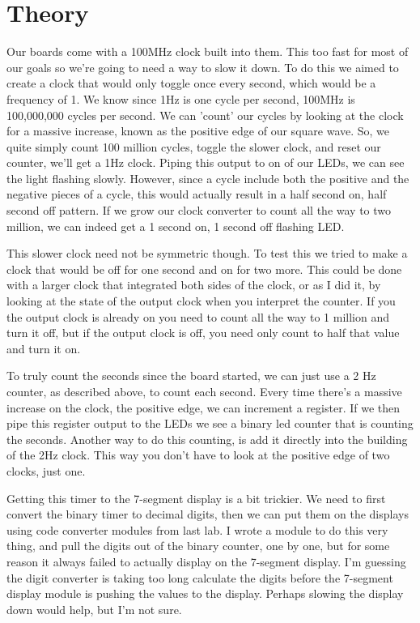 \documentclass[prb,preprint]{revtex4-1}
\begin{document}
\section{Theory}
Our boards come with a 100MHz clock built into them. This too fast for most of our goals so we're going to need a way to slow it down. To do this we aimed to create a clock that would only toggle once every second, which would be a frequency of 1. We know since 1Hz is one cycle per second, 100MHz is 100,000,000 cycles per second. We can 'count' our cycles by looking at the clock for a massive increase, known as the positive edge of our square wave. So, we quite simply count 100 million cycles, toggle the slower clock, and reset our counter, we'll get a 1Hz clock. Piping this output to on of our LEDs, we can see the light flashing slowly. However, since a cycle include both the positive and the negative pieces of a cycle, this would actually result in a half second on, half second off pattern. If we grow our clock converter to count all the way to two million, we can indeed get a 1 second on, 1 second off flashing LED.

This slower clock need not be symmetric though. To test this we tried to make a clock that would be off for one second and on for two more. This could be done with a larger clock that integrated both sides of the clock, or as I did it, by looking at the state of the output clock when you interpret the counter. If you the output clock is already on you need to count all the way to 1 million and turn it off, but if the output clock is off, you need only count to half that value and turn it on.

To truly count the seconds since the board started, we can just use a 2 Hz counter, as described above, to count each second. Every time there's a massive increase on the clock, the  positive edge, we can increment a register. If we then pipe this register output to the LEDs we see a binary led counter that is counting the seconds. Another way to do this counting, is add it directly into the building of the 2Hz clock. This way you don't have to look at the positive edge of two clocks, just one. 

Getting this timer to the 7-segment display is a bit trickier. We need to first convert the binary timer to decimal digits, then we can put them on the displays using code converter modules from last lab. I wrote a module to do this very thing, and pull the digits out of the binary counter, one by one, but for some reason it always failed to actually display on the 7-segment display. I'm guessing the digit converter is taking too long calculate the digits before the 7-segment display module is pushing the values to the display. Perhaps slowing the display down would help, but I'm not sure.
\end{document}
